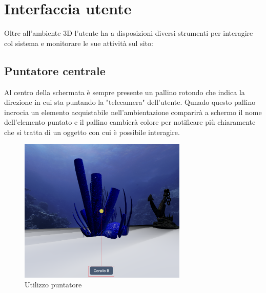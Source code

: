 \section{Interfaccia utente}
Oltre all'ambiente 3D l'utente ha a disposizioni diversi strumenti per interagire col sistema e monitorare le sue attività sul sito:
\subsection{Puntatore centrale}
Al centro della schermata è sempre presente un pallino rotondo che indica la direzione in cui sta puntando la "telecamera" dell'utente. Qunado questo pallino incrocia un elemento acquistabile nell'ambientazione comparirà a schermo il nome dell'elemento puntato e il pallino cambierà colore per notificare più chiaramente che si tratta di un oggetto con cui è possibile interagire.
\begin{figure}
  \renewcommand{\thefigure}{1}
\begin{center}
  \includegraphics[width=8cm]{./res/images/puntatore.png}
 \end{center}
 \caption{Utilizzo puntatore}
  \label{Utilizzo puntatore}
\end{figure}

\pagebreak

